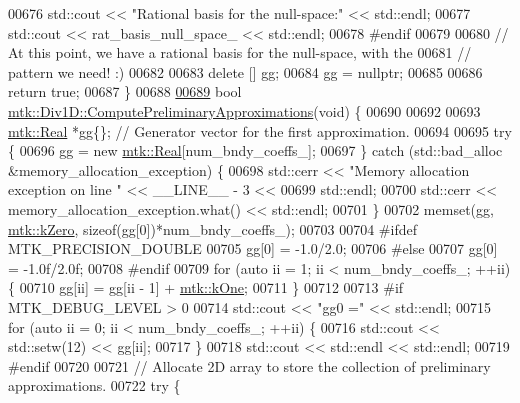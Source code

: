 \begin{DoxyCode}
{{00676   std::cout << \textcolor{stringliteral}{"Rational basis for the null-space:"} << std::endl;
00677   std::cout << rat\_basis\_null\_space\_ << std::endl;
00678 \textcolor{preprocessor}{  #endif}
00679 
00680   \textcolor{comment}{// At this point, we have a rational basis for the null-space, with the}
00681   \textcolor{comment}{// pattern we need! :)}
00682 
00683   \textcolor{keyword}{delete} [] gg;
00684   gg = \textcolor{keyword}{nullptr};
00685 
00686   \textcolor{keywordflow}{return} \textcolor{keyword}{true};
00687 \}
00688 
\hypertarget{mtk__div__1d_8cc_source_l00689}{}\hyperlink{classmtk_1_1Div1D_a4be0534a4e22d44a7aedde326cc3f3b6}{00689} \textcolor{keywordtype}{bool} \hyperlink{classmtk_1_1Div1D_a4be0534a4e22d44a7aedde326cc3f3b6}{mtk::Div1D::ComputePreliminaryApproximations}(\textcolor{keywordtype}{void}) \{
00690 
00692 
00693   \hyperlink{group__c01-roots_gac080bbbf5cbb5502c9f00405f894857d}{mtk::Real} *gg\{\}; \textcolor{comment}{// Generator vector for the first approximation.}
00694 
00695   \textcolor{keywordflow}{try} \{
00696     gg = \textcolor{keyword}{new} \hyperlink{group__c01-roots_gac080bbbf5cbb5502c9f00405f894857d}{mtk::Real}[num\_bndy\_coeffs\_];
00697   \} \textcolor{keywordflow}{catch} (std::bad\_alloc &memory\_allocation\_exception) \{
00698     std::cerr << \textcolor{stringliteral}{"Memory allocation exception on line "} << \_\_LINE\_\_ - 3 <<
00699 std::endl;
00700     std::cerr << memory\_allocation\_exception.what() << std::endl;
00701   \}
00702   memset(gg, \hyperlink{group__c01-roots_ga59a451a5fae30d59649bcda274fea271}{mtk::kZero}, \textcolor{keyword}{sizeof}(gg[0])*num\_bndy\_coeffs\_);
00703 
00704 \textcolor{preprocessor}{  #ifdef MTK\_PRECISION\_DOUBLE}
00705   gg[0] = -1.0/2.0;
00706 \textcolor{preprocessor}{  #else}
00707   gg[0] = -1.0f/2.0f;
00708 \textcolor{preprocessor}{  #endif}
00709   \textcolor{keywordflow}{for} (\textcolor{keyword}{auto} ii = 1; ii < num\_bndy\_coeffs\_; ++ii) \{
00710     gg[ii] = gg[ii - 1] + \hyperlink{group__c01-roots_ga26407c24d43b6b95480943340d285c71}{mtk::kOne};
00711   \}
00712 
00713 \textcolor{preprocessor}{  #if MTK\_DEBUG\_LEVEL > 0}
00714   std::cout << \textcolor{stringliteral}{"gg0 ="} << std::endl;
00715   \textcolor{keywordflow}{for} (\textcolor{keyword}{auto} ii = 0; ii < num\_bndy\_coeffs\_; ++ii) \{
00716     std::cout << std::setw(12) << gg[ii];
00717   \}
00718   std::cout << std::endl << std::endl;
00719 \textcolor{preprocessor}{  #endif}
00720 
00721   \textcolor{comment}{// Allocate 2D array to store the collection of preliminary approximations.}
00722   \textcolor{keywordflow}{try} \{
}}
\end{DoxyCode}
